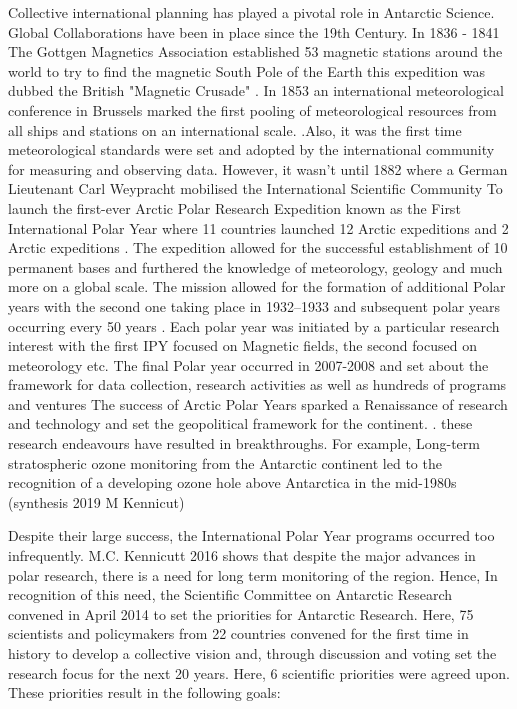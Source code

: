 Collective international planning has played a pivotal role in Antarctic Science. Global Collaborations have been in place since the 19th Century. In 1836 - 1841 The Gottgen Magnetics Association established 53 magnetic stations around the world to try to find the magnetic South Pole of the Earth this expedition was dubbed the British "Magnetic Crusade" \cite{tammiksaar2010international}. In 1853 an international meteorological conference in Brussels marked the first pooling of meteorological resources from all ships and stations on an international scale. \cite{tammiksaar2010international}.Also, it was the first time meteorological standards were set and adopted by the international community for measuring and observing data. However, it wasn't until 1882 where a German Lieutenant Carl Weypracht mobilised the International Scientific Community To launch the first-ever Arctic Polar Research Expedition \cite{tammiksaar2010international} known as the First International Polar Year where 11 countries launched 12 Arctic expeditions and 2 Arctic expeditions \cite{taylor1981first}. The expedition allowed for the successful establishment of 10 permanent bases and furthered the knowledge of meteorology, geology and much more on a global scale. The mission allowed for the formation of additional Polar years with the second one taking place in 1932–1933 \cite{ludecke2010second} and subsequent polar years occurring every 50 years \cite{kennicutt2016delivering}. Each polar year was initiated by a particular research interest with the first IPY focused on Magnetic fields, the second focused on meteorology etc. The final Polar year occurred in 2007-2008 and set about the framework for data collection, research activities as well as hundreds of programs and ventures  The success of Arctic Polar Years sparked a Renaissance of research and technology and set the geopolitical framework for the continent. \cite{kennicutt2016delivering}. these research endeavours have resulted in breakthroughs. For example, Long-term stratospheric ozone monitoring from the Antarctic continent led to the recognition of a developing ozone hole above Antarctica in the mid-1980s (synthesis 2019 M Kennicut)
\par 
Despite their large success, the International Polar Year programs occurred too infrequently. M.C. Kennicutt 2016 shows that despite the major advances in polar research, there is a need for long term monitoring of the region. Hence, In recognition of this need, the Scientific Committee on Antarctic Research convened in April 2014  \cite{kennicutt2016delivering}  to set the priorities for Antarctic Research. Here, 75 scientists and policymakers from 22 countries convened for the first time in history \cite{kennicutt2014polar} to develop a collective vision and, through discussion and voting set the research focus for the next 20 years. Here, 6 scientific priorities were agreed upon. These priorities result in the following goals:


